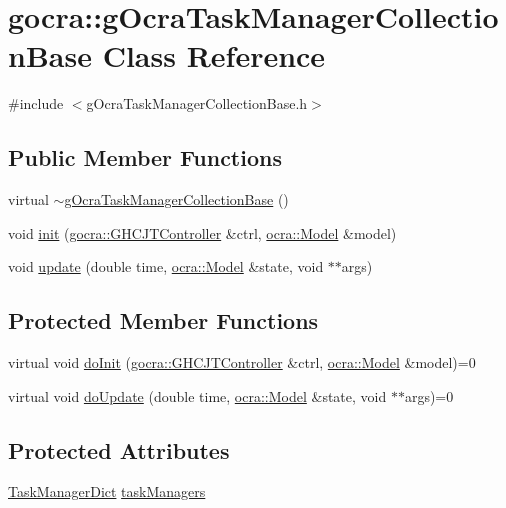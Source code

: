 \hypertarget{classgocra_1_1gOcraTaskManagerCollectionBase}{}\section{gocra\+:\+:g\+Ocra\+Task\+Manager\+Collection\+Base Class Reference}
\label{classgocra_1_1gOcraTaskManagerCollectionBase}


{\ttfamily \#include $<$g\+Ocra\+Task\+Manager\+Collection\+Base.\+h$>$}

\subsection*{Public Member Functions}
\begin{DoxyCompactItemize}
\item 
virtual \hyperlink{classgocra_1_1gOcraTaskManagerCollectionBase_afe4a8d100c2a8aae6263249145a2d941}{$\sim$g\+Ocra\+Task\+Manager\+Collection\+Base} ()
\item 
void \hyperlink{classgocra_1_1gOcraTaskManagerCollectionBase_ae962f18a286bc706ee867eede15822b6}{init} (\hyperlink{classgocra_1_1GHCJTController}{gocra\+::\+G\+H\+C\+J\+T\+Controller} \&ctrl, \hyperlink{classocra_1_1Model}{ocra\+::\+Model} \&model)
\item 
void \hyperlink{classgocra_1_1gOcraTaskManagerCollectionBase_a08764673857307135233d7a69ad49a69}{update} (double time, \hyperlink{classocra_1_1Model}{ocra\+::\+Model} \&state, void $\ast$$\ast$args)
\end{DoxyCompactItemize}
\subsection*{Protected Member Functions}
\begin{DoxyCompactItemize}
\item 
virtual void \hyperlink{classgocra_1_1gOcraTaskManagerCollectionBase_a81b68fbc3c26897cb4c971bd53199b78}{do\+Init} (\hyperlink{classgocra_1_1GHCJTController}{gocra\+::\+G\+H\+C\+J\+T\+Controller} \&ctrl, \hyperlink{classocra_1_1Model}{ocra\+::\+Model} \&model)=0
\item 
virtual void \hyperlink{classgocra_1_1gOcraTaskManagerCollectionBase_a42f29543b66d4ff1e297225e0f5c6501}{do\+Update} (double time, \hyperlink{classocra_1_1Model}{ocra\+::\+Model} \&state, void $\ast$$\ast$args)=0
\end{DoxyCompactItemize}
\subsection*{Protected Attributes}
\begin{DoxyCompactItemize}
\item 
\hyperlink{namespacegocra_ad407175473be2e361f2937acf73ca06c}{Task\+Manager\+Dict} \hyperlink{classgocra_1_1gOcraTaskManagerCollectionBase_a247b32be87662be87239195b726fabca}{task\+Managers}
\end{DoxyCompactItemize}


